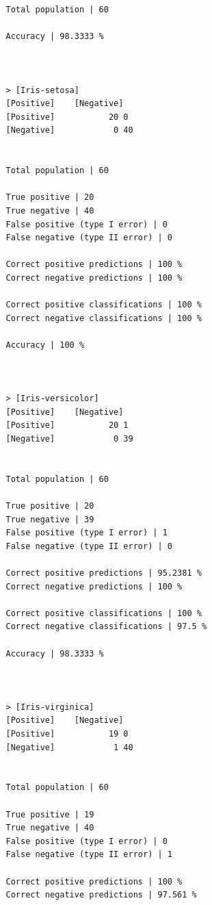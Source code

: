 \documentclass{classrep}
\begin{document}
{{{\begin{lstlisting}
                Total population | 60

                Accuracy | 98.3333 %



                > [Iris-setosa]
                [Positive]    [Negative]
                [Positive]           20 0
                [Negative]            0 40


                Total population | 60

                True positive | 20
                True negative | 40
                False positive (type I error) | 0
                False negative (type II error) | 0

                Correct positive predictions | 100 %
                Correct negative predictions | 100 %

                Correct positive classifications | 100 %
                Correct negative classifications | 100 %

                Accuracy | 100 %



                > [Iris-versicolor]
                [Positive]    [Negative]
                [Positive]           20 1
                [Negative]            0 39


                Total population | 60

                True positive | 20
                True negative | 39
                False positive (type I error) | 1
                False negative (type II error) | 0

                Correct positive predictions | 95.2381 %
                Correct negative predictions | 100 %

                Correct positive classifications | 100 %
                Correct negative classifications | 97.5 %

                Accuracy | 98.3333 %



                > [Iris-virginica]
                [Positive]    [Negative]
                [Positive]           19 0
                [Negative]            1 40


                Total population | 60

                True positive | 19
                True negative | 40
                False positive (type I error) | 0
                False negative (type II error) | 1

                Correct positive predictions | 100 %
                Correct negative predictions | 97.561 %


\end{lstlisting}}}}
\end{document}
